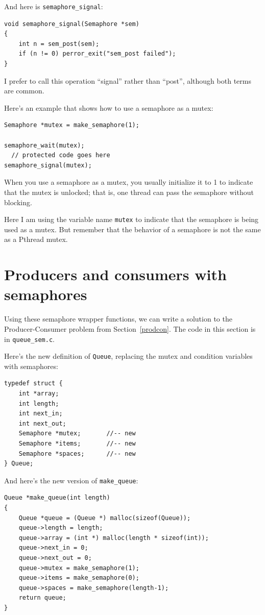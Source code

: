 \documentclass[12pt]{book}
\begin{document}
{And here is \verb"semaphore_signal":

\begin{verbatim}
void semaphore_signal(Semaphore *sem)
{
    int n = sem_post(sem);
    if (n != 0) perror_exit("sem_post failed");
}
\end{verbatim}

I prefer to call this operation ``signal'' rather than ``post'',
although both terms are common.

Here's an example that shows how to use a semaphore as a mutex:

\begin{verbatim}
Semaphore *mutex = make_semaphore(1);

semaphore_wait(mutex);
  // protected code goes here
semaphore_signal(mutex);
\end{verbatim}

When you use a semaphore as a mutex, you usually
initialize it to 1 to indicate
that the mutex is unlocked; that is, one thread can
pass the semaphore without blocking.

Here I am using the variable name {\tt mutex} to indicate that
the semaphore is being used as a mutex.  But remember that the behavior
of a semaphore is not the same as a Pthread mutex.


\section{Producers and consumers with semaphores}

Using these semaphore wrapper functions, we can
write a solution to the Producer-Consumer problem from
Section~\ref{prodcon}.
The code in this section is in \verb"queue_sem.c".

Here's the new definition of {\tt Queue}, replacing the mutex
and condition variables with semaphores:

\begin{verbatim}
typedef struct {
    int *array;
    int length;
    int next_in;
    int next_out;
    Semaphore *mutex;       //-- new
    Semaphore *items;       //-- new
    Semaphore *spaces;      //-- new
} Queue;
\end{verbatim}

And here's the new version of \verb"make_queue":

\begin{verbatim}
Queue *make_queue(int length)
{
    Queue *queue = (Queue *) malloc(sizeof(Queue));
    queue->length = length;
    queue->array = (int *) malloc(length * sizeof(int));
    queue->next_in = 0;
    queue->next_out = 0;
    queue->mutex = make_semaphore(1);
    queue->items = make_semaphore(0);
    queue->spaces = make_semaphore(length-1);
    return queue;
}
\end{verbatim}

}
\end{document}
